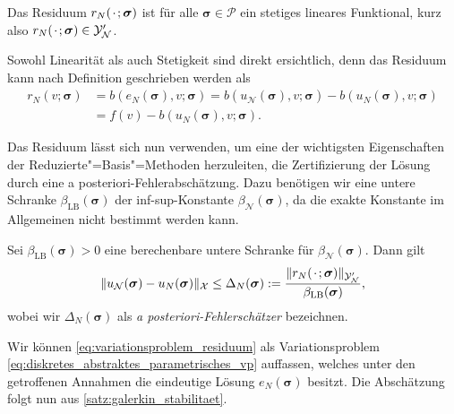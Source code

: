\documentclass[../main.tex]{subfiles}
\begin{document}
\begin{Lemma}
\label{lemma:rbm_residuum_ist_funktional}
    Das Residuum $r_{N}({\mkern2mu\cdot\mkern2mu}; \bm \sigma)$ ist für alle $\bm \sigma \in \mathcal P$ ein stetiges lineares Funktional, kurz also $r_{N}({\mkern2mu\cdot\mkern2mu}; \bm \sigma) \in \mathcal Y_{\mathcal N}'$.

    \begin{Beweis}
        Sowohl Linearität als auch Stetigkeit sind direkt ersichtlich, denn das Residuum kann nach Definition geschrieben werden als
        \begin{equation}
            \begin{aligned}
            r_{N}(v; \bm \sigma)
            &= b(e_{N}(\bm \sigma), v; \bm \sigma)
            = b(u_{\mathcal N}(\bm \sigma), v; \bm \sigma) - b(u_{N}(\bm \sigma), v; \bm \sigma)
            \\&= f(v) - b(u_{N}(\bm \sigma), v; \bm \sigma).
            \end{aligned}
        \end{equation}
    \end{Beweis}
\end{Lemma}

Das Residuum lässt sich nun verwenden, um eine der wichtigsten Eigenschaften der Reduzierte"=Basis"=Methoden herzuleiten, die Zertifizierung der Lösung durch eine a posteriori-Fehlerabschätzung.
Dazu benötigen wir eine untere Schranke $\beta_{\mathrm{LB}}(\bm \sigma)$ der inf-sup-Konstante $\beta_{\mathcal N}(\bm \sigma)$, da die exakte Konstante im Allgemeinen nicht bestimmt werden kann.

\begin{Lemma}
\label{lemma:rbm_fehler_schranke}
    Sei $\beta_{\mathrm{LB}}(\bm \sigma) > 0$ eine berechenbare untere Schranke für $\beta_{\mathcal N}(\bm \sigma)$.
    Dann gilt
    \begin{equation}
        \lVert u_{\mathcal N}(\bm \sigma) - u_{N}(\bm \sigma)\rVert_{\mathcal X} \leq \Delta_{N}(\bm \sigma) := \frac{\lVert r_{N}({\mkern2mu\cdot\mkern2mu}; \bm \sigma)\rVert_{\mathcal Y_{\mathcal N}'}}{\beta_{\mathrm{LB}}(\bm \sigma)},
    \end{equation}
    wobei wir $\Delta_{N}(\bm \sigma)$ als \emph{a posteriori-Fehlerschätzer} bezeichnen.

    \begin{Beweis}
        Wir können \cref{eq:variationsproblem_residuum} als Variationsproblem \cref{eq:diskretes_abstraktes_parametrisches_vp} auffassen, welches unter den getroffenen Annahmen die eindeutige Lösung $e_{N}(\bm \sigma)$ besitzt.
        Die Abschätzung folgt nun aus \cref{satz:galerkin_stabilitaet}.
    \end{Beweis}
\end{Lemma}
\end{document}
